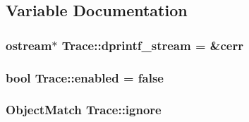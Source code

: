 \subsection{Variable Documentation}
\hypertarget{namespaceTrace_a58559cb033c06f1aa031c3c3da03c324}{
\subsubsection[{dprintf\_\-stream}]{\setlength{\rightskip}{0pt plus 5cm}ostream$\ast$ {\bf Trace::dprintf\_\-stream} = \&cerr}}
\label{namespaceTrace_a58559cb033c06f1aa031c3c3da03c324}
\hypertarget{namespaceTrace_a7eceed02e84cba66f80ba6e5fc184ebc}{
\subsubsection[{enabled}]{\setlength{\rightskip}{0pt plus 5cm}bool {\bf Trace::enabled} = false}}
\label{namespaceTrace_a7eceed02e84cba66f80ba6e5fc184ebc}
\hypertarget{namespaceTrace_a58099233c1194638eed4e30f4adfed73}{
\subsubsection[{ignore}]{\setlength{\rightskip}{0pt plus 5cm}ObjectMatch {\bf Trace::ignore}}}
\label{namespaceTrace_a58099233c1194638eed4e30f4adfed73}
